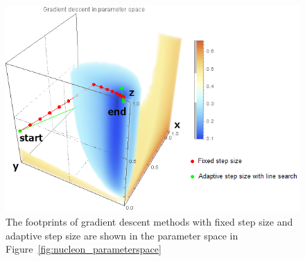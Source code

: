 \begin{figure}
	\centering
	\begin{minipage}{.9\textwidth}
		\includegraphics[width=1\linewidth]{images/parameterspace_path}
	\end{minipage}
	\caption{The footprints of gradient descent methods with fixed step size and adaptive step size are shown in the parameter space in Figure~\ref{fig:nucleon_parameterspace}}
	\label{fig:nucleon_parameterspace_path}
\end{figure}

